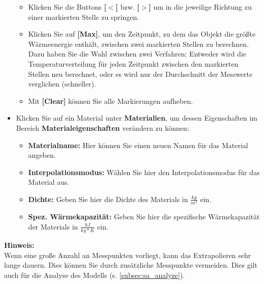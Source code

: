 \documentclass[10pt,a5paper,twoside,titlepage]{scrartcl}
\newenvironment{myshaded}
  {\def\FrameCommand{\colorbox{shadecolor}}
    \MakeFramed {\advance\hsize-\width \FrameRestore}}
 {\endMakeFramed}
\newenvironment{hinweis}
  {\colorlet{shadecolor}{black!20}%
      \begin{myshaded}
      \begin{minipage}{\linewidth}
	  \hangindent 20pt  
      \textbf{Hinweis:}\\
      }
  {\end{minipage}\end{myshaded}}
\begin{document}
\begin{itemize}
\begin{itemize}
	\item Klicken Sie die Buttons \textbf{[$<$]} bzw. \textbf{[$>$]} um in die jeweilige Richtung zu einer markierten Stelle zu springen.
	\item Klicken Sie auf \textbf{[Max]}, um den Zeitpunkt, zu dem das Objekt die größte Wärmeenergie enthält, zwischen zwei markierten Stellen zu berechnen. Dazu haben Sie die Wahl zwischen zwei Verfahren: Entweder wird die Temperaturverteilung für jeden Zeitpunkt zwischen den markierten Stellen neu berechnet, oder es wird nur der Durchschnitt der Messwerte verglichen (schneller).
	\item Mit \textbf{[Clear]} können Sie alle Markierungen aufheben.
	\end{itemize}
	\item Klicken Sie auf ein Material unter \textbf{Materialien}, um dessen Eigenschaften im Bereich \textbf{Materialeigenschaften} verändern zu können:
	\begin{itemize}
	\item \textbf{Materialname:} Hier können Sie einen neuen Namen für das Material angeben.
	\item \textbf{Interpolationsmodus:} Wählen Sie hier den Interpolationsmodus für das Material aus.
	\item \textbf{Dichte:} Geben Sie hier die Dichte des Materials in $\frac{kg}{m^3}$ ein.
	\item \textbf{Spez. Wärmekapazität:} Geben Sie hier die spezifische Wärmekapazität der Materials in $\frac{kJ}{kg*K}$ ein.
	\end{itemize}
	\end{itemize}
	\begin{hinweis}
	Wenn eine große Anzahl an Messpunkten vorliegt, kann das Extrapolieren sehr lange dauern. Dies können Sie durch zusätzliche Messpunkte vermeiden. Dies gilt auch für die Analyse des Modells (s. \ref{subsec:sa_analyze}).
	\end{hinweis}
\end{document}
